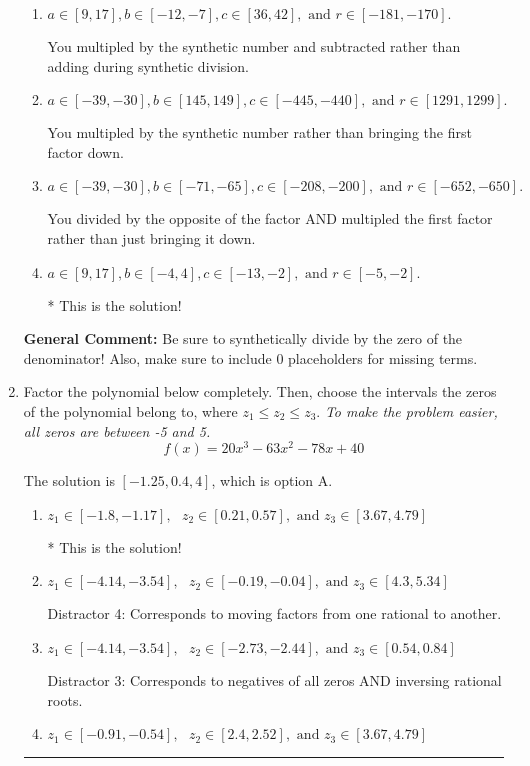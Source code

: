 \documentclass{extbook}[14pt]
\newcommand{\litem}[1]{\item #1

\rule{\textwidth}{0.4pt}}
\begin{document}
\begin{enumerate}
{\begin{enumerate}[label=\Alph*.]
 You divided by the opposite of the factor.
\item \( a \in [9, 17], b \in [-12, -7], c \in [36, 42], \text{ and } r \in [-181, -170]. \)

 You multipled by the synthetic number and subtracted rather than adding during synthetic division.
\item \( a \in [-39, -30], b \in [145, 149], c \in [-445, -440], \text{ and } r \in [1291, 1299]. \)

 You multipled by the synthetic number rather than bringing the first factor down.
\item \( a \in [-39, -30], b \in [-71, -65], c \in [-208, -200], \text{ and } r \in [-652, -650]. \)

 You divided by the opposite of the factor AND multipled the first factor rather than just bringing it down.
\item \( a \in [9, 17], b \in [-4, 4], c \in [-13, -2], \text{ and } r \in [-5, -2]. \)

* This is the solution!
\end{enumerate}

\textbf{General Comment:} Be sure to synthetically divide by the zero of the denominator! Also, make sure to include 0 placeholders for missing terms.
}
\litem{
Factor the polynomial below completely. Then, choose the intervals the zeros of the polynomial belong to, where $z_1 \leq z_2 \leq z_3$. \textit{To make the problem easier, all zeros are between -5 and 5.}
\[ f(x) = 20x^{3} -63 x^{2} -78 x + 40 \]

The solution is \( [-1.25, 0.4, 4] \), which is option A.\begin{enumerate}[label=\Alph*.]
\item \( z_1 \in [-1.8, -1.17], \text{   }  z_2 \in [0.21, 0.57], \text{   and   } z_3 \in [3.67, 4.79] \)

* This is the solution!
\item \( z_1 \in [-4.14, -3.54], \text{   }  z_2 \in [-0.19, -0.04], \text{   and   } z_3 \in [4.3, 5.34] \)

 Distractor 4: Corresponds to moving factors from one rational to another.
\item \( z_1 \in [-4.14, -3.54], \text{   }  z_2 \in [-2.73, -2.44], \text{   and   } z_3 \in [0.54, 0.84] \)

 Distractor 3: Corresponds to negatives of all zeros AND inversing rational roots.
\item \( z_1 \in [-0.91, -0.54], \text{   }  z_2 \in [2.4, 2.52], \text{   and   } z_3 \in [3.67, 4.79] \)


\end{enumerate}}
\end{enumerate}
\end{document}
